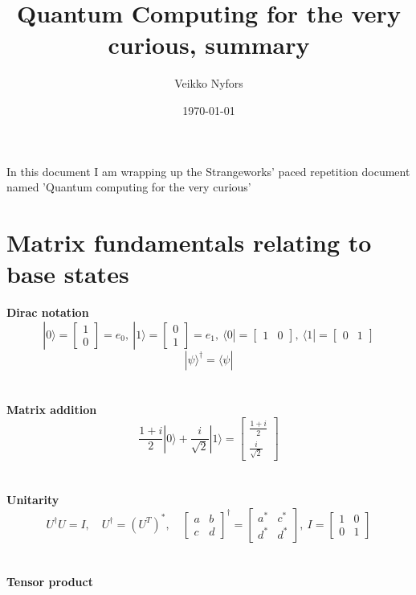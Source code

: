 \documentclass[11pt, fleqn]{article}
\title{Quantum Computing for the very curious, summary}
\author{Veikko Nyfors}
\date{\today}
\begin{document}
\maketitle

In this document I am wrapping up the Strangeworks' paced repetition document named 'Quantum computing for the very curious'
\newpage

\section{Matrix fundamentals relating to base states}

\bf{Dirac notation}
\[|0\rangle=\begin{bmatrix} 1\\0\end{bmatrix}=e_0,\:
|1\rangle=\begin{bmatrix} 0\\1\end{bmatrix}=e_1,\:
\langle0|=\begin{bmatrix} 1&0\end{bmatrix},\:\langle1|=\begin{bmatrix} 0&1\end{bmatrix}\]
\[|\psi\rangle^\dagger=\langle\psi|\]
\\~\\
\bf{Matrix addition}
\[\frac{1+i}{2}|0\rangle + \frac{i}{\sqrt{2}}|1\rangle = \begin{bmatrix} \frac{1+i}{2}\\\frac{i}{\sqrt{2}} \end{bmatrix}\]
\\~\\
\bf{Unitarity}
\[U^\dagger U=I,\quad U^\dagger=(U^T)^*,\quad
\begin{bmatrix}a & b\\c & d\end{bmatrix}^\dagger=\begin{bmatrix}a^* & c^*\\d^* & d^*\end{bmatrix},\:I=\begin{bmatrix}1&0\\0&1\end{bmatrix}\]
\\~\\
\bf{Tensor product\\}
\end{document}
